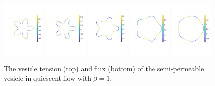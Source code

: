 \documentclass[aps,prl,showpacs]{revtex4}
\begin{document}
\begin{figure}[htp]
  \includegraphics[width=0.19\textwidth,trim =2cm 5cm 0cm 5cm, clip=true]{figures/StarFluxTime1.pdf}
  \includegraphics[width=0.19\textwidth,trim =2cm 5cm 0cm 5cm, clip=true]{figures/StarFluxTime2.pdf}
  \includegraphics[width=0.19\textwidth,trim =2cm 5cm 0cm 5cm, clip=true]{figures/StarFluxTime3.pdf}
  \includegraphics[width=0.19\textwidth,trim =2cm 5cm 0cm 5cm, clip=true]{figures/StarFluxTime4.pdf}
  \includegraphics[width=0.19\textwidth,trim =2cm 5cm 0cm 5cm, clip=true]{figures/StarFluxTime5.pdf}
  \caption{\label{fig:starTensionFlux} The vesicle tension (top) and
  flux (bottom) of the semi-permeable vesicle in quiescent
  flow with $\beta=1$.}
\end{figure}
\end{document}
